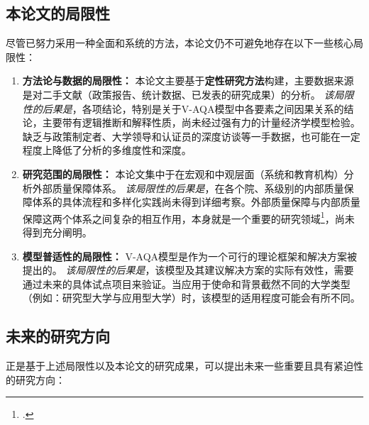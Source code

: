 \subsection{本论文的局限性}
\label{subsec:han_che_luan_an}

尽管已努力采用一种全面和系统的方法，本论文仍不可避免地存在以下一些核心局限性：

\begin{enumerate}
    \item \textbf{方法论与数据的局限性：} 本论文主要基于\textbf{定性研究方法}构建，主要数据来源是对二手文献（政策报告、统计数据、已发表的研究成果）的分析。
    \textit{该局限性的后果是}，各项结论，特别是关于V-AQA模型中各要素之间因果关系的结论，主要带有逻辑推断和解释性质，尚未经过强有力的计量经济学模型检验。缺乏与政策制定者、大学领导和认证员的深度访谈等一手数据，也可能在一定程度上降低了分析的多维度性和深度。

    \item \textbf{研究范围的局限性：} 本论文集中于在宏观和中观层面（系统和教育机构）分析外部质量保障体系。
    \textit{该局限性的后果是}，在各个院、系级别的内部质量保障体系的具体流程和多样化实践尚未得到详细考察。外部质量保障与内部质量保障这两个体系之间复杂的相互作用，本身就是一个重要的研究领域\footcite{eua_iqa_eqa_link}，尚未得到充分阐明。

    \item \textbf{模型普适性的局限性：} V-AQA模型是作为一个可行的理论框架和解决方案被提出的。
    \textit{该局限性的后果是}，该模型及其建议解决方案的实际有效性，需要通过未来的具体试点项目来验证。当应用于使命和背景截然不同的大学类型（例如：研究型大学与应用型大学）时，该模型的适用程度可能会有所不同。
\end{enumerate}

\subsection{未来的研究方向}
\label{subsec:huong_nghien_cuu_tuong_lai}

正是基于上述局限性以及本论文的研究成果，可以提出未来一些重要且具有紧迫性的研究方向：

